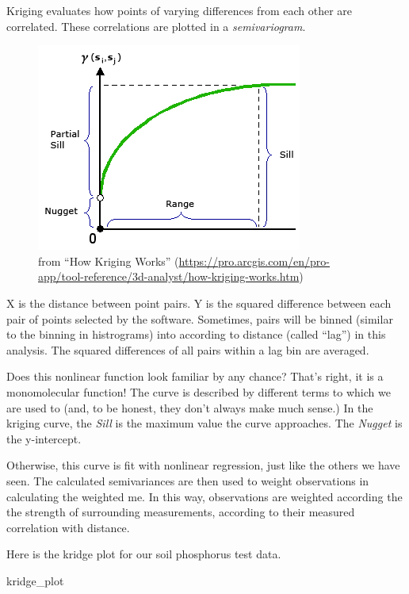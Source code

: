 \documentclass[
]{book}
\newenvironment{Shaded}{\begin{snugshade}}{\end{snugshade}}
\newcommand{\NormalTok}[1]{#1}
\begin{document}
Kriging evaluates how points of varying differences from each other are correlated. These correlations are plotted in a \emph{semivariogram}.

\begin{figure}
\centering
\includegraphics{data-unit-12/images/range_sill_nugget.png}
\caption{from ``How Kriging Works'' (\url{https://pro.arcgis.com/en/pro-app/tool-reference/3d-analyst/how-kriging-works.htm})}
\end{figure}

X is the distance between point pairs. Y is the squared difference between each pair of points selected by the software. Sometimes, pairs will be binned (similar to the binning in histrograms) into according to distance (called ``lag'') in this analysis. The squared differences of all pairs within a lag bin are averaged.

Does this nonlinear function look familiar by any chance? That's right, it is a monomolecular function! The curve is described by different terms to which we are used to (and, to be honest, they don't always make much sense.) In the kriging curve, the \emph{Sill} is the maximum value the curve approaches. The \emph{Nugget} is the y-intercept.

Otherwise, this curve is fit with nonlinear regression, just like the others we have seen. The calculated semivariances are then used to weight observations in calculating the weighted me. In this way, observations are weighted according the the strength of surrounding measurements, according to their measured correlation with distance.

Here is the kridge plot for our soil phosphorus test data.

\begin{Shaded}
\begin{Highlighting}[]
\NormalTok{kridge\_plot}
\end{Highlighting}
\end{Shaded}
\end{document}
